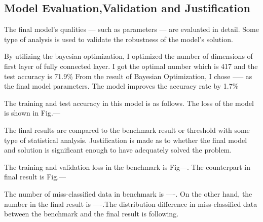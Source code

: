 \subsection{Model Evaluation,Validation and Justification}
The final model’s qualities — such as parameters — are evaluated in detail. Some type of analysis is used to validate the robustness of the model’s solution.

By utilizing the bayesian optimization, I optimized the number of dimensions of first layer of fully connected layer. I got the optimal number which is 417 and the test accuracy is 71.9\%
From the result of Bayesian Optimization, I chose ----- as the final model parameters.
The model improves the accuracy rate by 1.7\%

The training and test accuracy in this model is as follows.
The loss of the model is shown in Fig.--- 





The final results are compared to the benchmark result or threshold with some type of statistical analysis. Justification is made as to whether the final model and solution is significant enough to have adequately solved the problem.




The training and validation loss in the benchmark is Fig---. The counterpart in final result is Fig.---


The number of miss-classified data in benchmark is ----. On the other hand, the number in the final result is ----.The distribution difference in miss-classified data between the benchmark and the final result is following.
